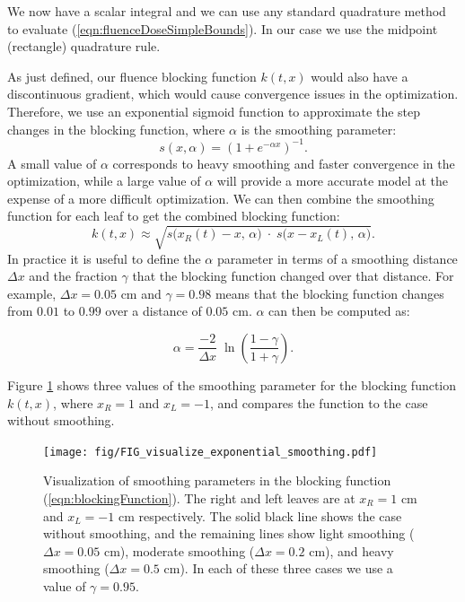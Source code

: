 \documentclass{iopart}
\begin{document}
We now have a scalar integral and we can use any standard quadrature method to evaluate (\ref{eqn:fluenceDoseSimpleBounds}).
In our case we use the midpoint (rectangle) quadrature rule.

As just defined, our fluence blocking function $k(t,x)$
would also have a discontinuous gradient, which would cause convergence issues in the optimization.
Therefore, we use an exponential sigmoid function 
to approximate the step changes in the blocking function, where $\alpha$ is the smoothing parameter: 
\begin{equation}
  s(x, \alpha) = (1 + e^{-\alpha x})^{-1} .
  \label{eqn:sigmoidEquation}
\end{equation}
A small value of $\alpha$ corresponds to heavy smoothing and faster convergence in the optimization, while a large value of $\alpha$ will provide a more accurate model at the expense of a more difficult optimization.
We can then combine the smoothing function for each leaf to get the combined blocking function:
\begin{equation}
  k(t, x) \approx \sqrt{s\big(x_R(t) -x, \, \alpha\big) \; \cdot \; s\big(x -x_L(t), \, \alpha\big)} .
  \label{eqn:blockingFunction}
\end{equation}
\noindent In practice it is useful to define the $\alpha$ parameter in terms of 
a smoothing distance $\Delta x$ and 
the fraction $\gamma$ that the blocking function changed over that distance.
For example, $\Delta x = 0.05$ cm and $\gamma = 0.98$ means that 
the blocking function changes from $0.01$ to $0.99$ over a distance of $0.05$ cm. $\alpha$ can then be computed as:

\begin{equation}
  \alpha = \frac{-2}{\Delta x} \; \ln \! \left( \frac{1 - \gamma}{1 + \gamma} \right) .
  \label{eqn:SmoothingDistanceParameter}
\end{equation}

Figure \ref{fig:visualizeExponentialSmoothing} shows three values of the smoothing parameter for the blocking function $k(t, x)$, where $x_R = 1$ and $x_L = -1$, and compares the function to the case without smoothing.

\begin{figure}
  \centering
  \texttt{[image: fig/FIG\_visualize\_exponential\_smoothing.pdf]}
  \caption{Visualization of smoothing parameters in the blocking function (\ref{eqn:blockingFunction}). The right and left leaves are at $x_R = 1$ cm and $x_L = -1$ cm respectively. The solid black line shows the case without smoothing, and the remaining lines show light smoothing ($\Delta x = 0.05$ cm), moderate smoothing ($\Delta x = 0.2$ cm), and heavy smoothing ($\Delta x = 0.5$ cm). In each of these three cases we use a value of $\gamma = 0.95$.}
  \label{fig:visualizeExponentialSmoothing}
\end{figure}
\end{document}
